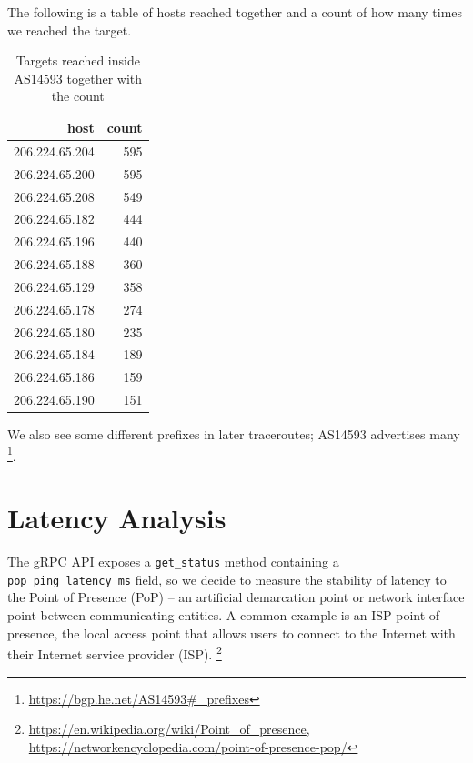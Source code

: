 \documentclass[IN,11pt,twoside,openright,idp,english]{tumthesis}
\begin{document}
The following is a table of hosts reached together and a count of how many times we reached the target.
    
\begin{table}
    \centering
    \begin{tabular}{ r r }
        \toprule
            host           & count \\ 
            \midrule
            206.224.65.204 & 595   \\
            206.224.65.200 & 595   \\
            206.224.65.208 & 549   \\ 
            206.224.65.182 & 444   \\
            206.224.65.196 & 440   \\ 
            206.224.65.188 & 360   \\ 
            206.224.65.129 & 358   \\ 
            206.224.65.178 & 274   \\ 
            206.224.65.180 & 235   \\ 
            206.224.65.184 & 189   \\ 
            206.224.65.186 & 159   \\ 
            206.224.65.190 & 151   \\
            \bottomrule
    \end{tabular}
    \caption{Targets reached inside AS14593 together with the count}
\end{table}

We also see some different prefixes in later traceroutes; AS14593 advertises many \footnote{\url{https://bgp.he.net/AS14593\#_prefixes}}.
    
\section{Latency Analysis}

The gRPC API exposes a \texttt{get\_status} method containing a \texttt{pop\_ping\_latency\_ms} field, so we decide to measure the stability of latency to the Point of Presence (PoP) -- an artificial demarcation point or network interface point between communicating entities. A common example is an ISP point of presence, the local access point that allows users to connect to the Internet with their Internet service provider (ISP). \footnote{\url{https://en.wikipedia.org/wiki/Point_of_presence}, \url{https://networkencyclopedia.com/point-of-presence-pop/}}
\end{document}
